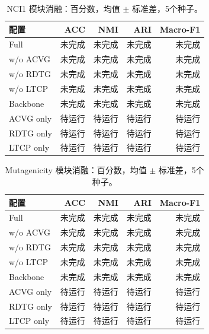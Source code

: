 \begin{table}[ht]
\centering
\caption{NCI1 模块消融：百分数，均值 $\pm$ 标准差，5个种子。}
\begin{tabular}{lrrrr}
\hline
配置 & ACC & NMI & ARI & Macro-F1 \\
\hline
Full & 未完成 & 未完成 & 未完成 & 未完成 \\
w/o ACVG & 未完成 & 未完成 & 未完成 & 未完成 \\
w/o RDTG & 未完成 & 未完成 & 未完成 & 未完成 \\
w/o LTCP & 未完成 & 未完成 & 未完成 & 未完成 \\
Backbone & 未完成 & 未完成 & 未完成 & 未完成 \\
ACVG only & 待运行 & 待运行 & 待运行 & 待运行 \\
RDTG only & 待运行 & 待运行 & 待运行 & 待运行 \\
LTCP only & 待运行 & 待运行 & 待运行 & 待运行 \\
\hline
\end{tabular}
\end{table}

\begin{table}[ht]
\centering
\caption{Mutagenicity 模块消融：百分数，均值 $\pm$ 标准差，5个种子。}
\begin{tabular}{lrrrr}
\hline
配置 & ACC & NMI & ARI & Macro-F1 \\
\hline
Full & 未完成 & 未完成 & 未完成 & 未完成 \\
w/o ACVG & 未完成 & 未完成 & 未完成 & 未完成 \\
w/o RDTG & 未完成 & 未完成 & 未完成 & 未完成 \\
w/o LTCP & 未完成 & 未完成 & 未完成 & 未完成 \\
Backbone & 未完成 & 未完成 & 未完成 & 未完成 \\
ACVG only & 待运行 & 待运行 & 待运行 & 待运行 \\
RDTG only & 待运行 & 待运行 & 待运行 & 待运行 \\
LTCP only & 待运行 & 待运行 & 待运行 & 待运行 \\
\hline
\end{tabular}
\end{table}

